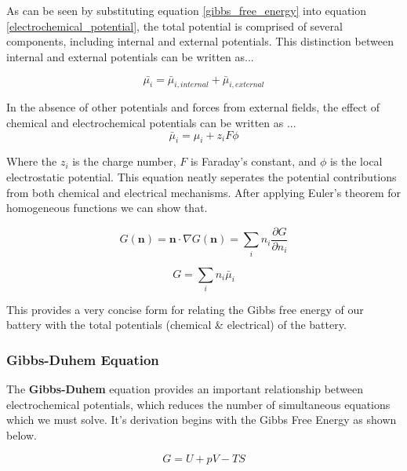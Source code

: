 \documentclass[lettersize,journal]{IEEEtran}
\begin{document}
 As can be seen by substituting equation \ref{gibbs_free_energy} into equation \ref{electrochemical_potential}, the total potential is comprised of several components, including internal and external potentials. This distinction between internal and external potentials can be written as...

\begin{equation}
  \bar{\mu_{i}} = \bar{\mu}_{i, internal} + \bar{\mu}_{i, external}
\end{equation}

 In the absence of other potentials and forces from external fields, the effect of chemical and electrochemical potentials can be written as ...
 \begin{equation}\label{total_potential}
   \bar{\mu}_{i} = \mu_{i} + z_i F \phi
 \end{equation}

Where the $z_i$ is the charge number, $F$ is Faraday's constant, and $\phi$ is the local electrostatic potential.
This equation neatly seperates the potential contributions from both chemical and electrical mechanisms. After applying Euler's theorem for homogeneous functions we can show that.

\begin{equation}
  G(\textbf{n}) = \textbf{n} \cdot \nabla G (\textbf{n}) = \sum_i n_i \frac{\partial G}{\partial n_i}
\end{equation}

\begin{equation}\label{gibbs_summation}
  G = \sum_i n_i \bar{\mu}_i
\end{equation}

\noindent This provides a very concise form for relating the Gibbs free energy of our battery with the total potentials (chemical \& electrical) of the battery.  \\

\subsubsection{Gibbs-Duhem Equation}
The \textbf{Gibbs-Duhem} equation provides an important relationship between electrochemical potentials, which reduces the number of simultaneous equations which we must solve. It's derivation begins with the Gibbs Free Energy as shown below.

\begin{equation}
  G = U + pV - TS
\end{equation}
\end{document}
